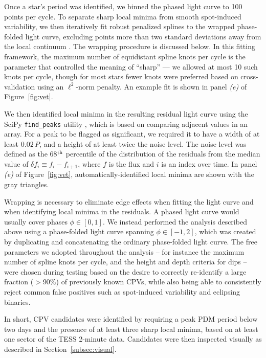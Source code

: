 \documentclass[11pt,twocolumn,tighten]{aastex63}
\begin{document}
Once a star's period was identified, we binned the phased light curve
to 100 points per cycle.  To separate sharp local minima from smooth
spot-induced variability, we then iteratively fit robust penalized
splines to the wrapped phase-folded light curve, excluding points more
than two standard deviations away from the local continuum
\citep{2019AJ....158..143H}.  The wrapping procedure is discussed
below.  In this fitting framework, the maximum number of equidistant
spline knots per cycle is the parameter that controlled the meaning of
``sharp'' --- we allowed at most 10 such knots per cycle, though for
most stars fewer knots were preferred based on cross-validation using
an $\ell^2$-norm penalty.  An example fit is shown in panel {\it (e)}
of Figure~\ref{fig:vet}.

We then identified local minima in the resulting residual light curve
using the SciPy \texttt{find\_peaks} utility
\citep{2020NatMe..17..261V}, which is based on comparing adjacent
values in an array.  For a peak to be flagged as significant, we
required it to have a width of at least $0.02\,P$, and a height of at
least twice the noise level.  The noise level was defined as the
68$^{\rm th}$ percentile of the distribution of the residuals from the
median value of $\delta f_i \equiv f_i - f_{i+1}$, where $f$ is the
flux and $i$ is an index over time.  In panel {\it (e)} of
Figure~\ref{fig:vet}, automatically-identified local minima are shown
with the gray triangles.

Wrapping is necessary to eliminate edge effects when fitting the light
curve and when identifying local minima in the residuals.  A phased
light curve would usually cover phases $\phi \in [ 0,1 ]$.  We instead
performed the analysis described above using a phase-folded light
curve spanning $\phi \in [-1,2 ]$, which was created by duplicating
and concatenating the ordinary phase-folded light curve.  The free
parameters we adopted throughout the analysis -- for instance the
maximum number of spline knots per cycle, and the height and depth
criteria for dips -- were chosen during testing based on the desire to
correctly re-identify a large fraction ($>$90\%) of previously known
CPVs, while also being able to consistently reject common false
positives such as spot-induced variability and eclipsing binaries.

In short, CPV candidates were identified by requiring a peak PDM
period below two days and the presence of at least three sharp local
minima, based on at least one sector of the TESS 2-minute data.
Candidates were then inspected visually as described in
Section~\ref{subsec:visual}.
\end{document}
